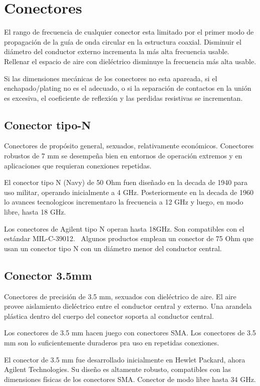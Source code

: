 	\section{Conectores}

El rango de frecuencia de cualquier conector esta limitado por el primer modo de propagación de la guía de onda circular
en la estructura coaxial. Disminuir el diámetro del conductor externo incrementa la más alta frecuencia usable.
Rellenar el espacio de aire con dieléctrico disminuye la frecuencia más alta usable.

Si las dimensiones mecánicas de los conectores no esta apareada, si el enchapado/plating no es el adecuado, o si la
separación de contactos en la unión es excesiva, el coeficiente de reflexión y las perdidas resistivas se incrementan.

\subsection{Conector tipo-N}

Conectores de propósito general, sexuados, relativamente económicos. Conectores robustos de 7 mm se desempeña bien en
entornos de operación extremos y en aplicaciones que requieran conexiones repetidas.

El conector tipo N (Navy) de 50 Ohm fuen diseñado en la decada de 1940 para uso militar, operando inicialmente a 4 GHz.
Posteriormente en la decada de 1960 lo avances tecnologicos incrementaro la frecuencia a 12 GHz y luego, en modo libre,
hasta 18 GHz.

Los conectores de Agilent tipo N operan hasta 18GHz. Son compatibles con el estándar MIL-C-39012. \ Algunos productos
emplean un conector de 75 Ohm que usan un conector tipo N con un diámetro menor del conductor central.		

\subsection{Conector 3.5mm}

Conectores de precisión de 3.5 mm, sexuados con dieléctrico de aire. El aire provee aislamiento dieléctrico entre el
conductor central y externo. Una arandela plástica dentro del cuerpo del conector soporta al conductor central.

Los conectores de 3.5 mm hacen juego con conectores SMA. Los conectores de 3.5 mm son lo suficientemente duraderos pra
uso en repetidas conexiones.

El conector de 3.5 mm fue desarrollado inicialmente en Hewlet Packard, ahora Agilent Technologies. Su diseño es
altamente robusto, compatibles con las dimensiones físicas de los conectores SMA. Conector de modo libre hasta 34 GHz. 

